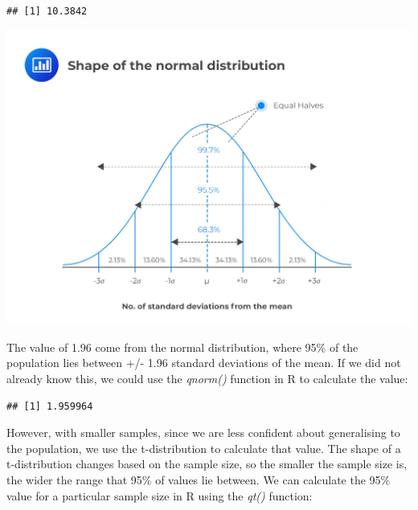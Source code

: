 \documentclass[
]{book}
\newenvironment{Shaded}{\begin{snugshade}}{\end{snugshade}}
\newcommand{\CommentTok}[1]{\textcolor[rgb]{0.56,0.35,0.01}{\textit{#1}}}
\newcommand{\FloatTok}[1]{\textcolor[rgb]{0.00,0.00,0.81}{#1}}
\newcommand{\KeywordTok}[1]{\textcolor[rgb]{0.13,0.29,0.53}{\textbf{#1}}}
\newcommand{\NormalTok}[1]{#1}
\begin{document}
\begin{verbatim}
## [1] 10.3842
\end{verbatim}

\includegraphics[width=20.32in]{images/normal}

The value of 1.96 come from the normal distribution, where 95\% of the population lies between +/- 1.96 standard deviations of the mean. If we did not already know this, we could use the \emph{qnorm()} function in R to calculate the value:

\begin{Shaded}
\end{Shaded}

\begin{verbatim}
## [1] 1.959964
\end{verbatim}

However, with smaller samples, since we are less confident about generalising to the population, we use the t-distribution to calculate that value. The shape of a t-distribution changes based on the sample size, so the smaller the sample size is, the wider the range that 95\% of values lie between. We can calculate the 95\% value for a particular sample size in R using the \emph{qt()} function:
\end{document}
